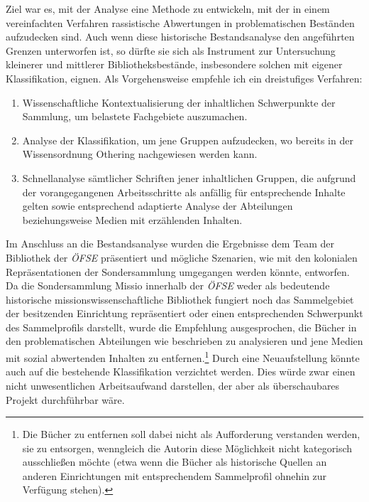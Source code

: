 \documentclass[a4paper,
fontsize=11pt,
oneside,
numbers=noperiodatend,
parskip=half-,
bibliography=totoc,
final
]{scrartcl}
\begin{document}
Ziel war es, mit der Analyse eine Methode zu entwickeln, mit der in
einem vereinfachten Verfahren rassistische Abwertungen in
problematischen Beständen aufzudecken sind. Auch wenn diese historische
Bestandsanalyse den angeführten Grenzen unterworfen ist, so dürfte sie
sich als Instrument zur Untersuchung kleinerer und mittlerer
Bibliotheksbestände, insbesondere solchen mit eigener Klassifikation,
eignen. Als Vorgehensweise empfehle ich ein dreistufiges Verfahren:

\begin{enumerate}
\def\labelenumi{\arabic{enumi}.}
\item
  Wissenschaftliche Kontextualisierung der inhaltlichen Schwerpunkte der
  Sammlung, um belastete Fachgebiete auszumachen.
\item
  Analyse der Klassifikation, um jene Gruppen aufzudecken, wo bereits in
  der Wissensordnung Othering nachgewiesen werden kann.
\item
  Schnellanalyse sämtlicher Schriften jener inhaltlichen Gruppen, die
  aufgrund der vorangegangenen Arbeitsschritte als anfällig für
  entsprechende Inhalte gelten sowie entsprechend adaptierte Analyse der
  Abteilungen beziehungsweise Medien mit erzählenden Inhalten.
\end{enumerate}

Im Anschluss an die Bestandsanalyse wurden die Ergebnisse dem Team der
Bibliothek der \emph{ÖFSE} präsentiert und mögliche Szenarien, wie mit
den kolonialen Repräsentationen der Sondersammlung umgegangen werden
könnte, entworfen. Da die Sondersammlung Missio innerhalb der
\emph{ÖFSE} weder als bedeutende historische missionswissenschaftliche
Bibliothek fungiert noch das Sammelgebiet der besitzenden Einrichtung
repräsentiert oder einen entsprechenden Schwerpunkt des Sammelprofils
darstellt, wurde die Empfehlung ausgesprochen, die Bücher in den
problematischen Abteilungen wie beschrieben zu analysieren und jene
Medien mit sozial abwertenden Inhalten zu entfernen.\footnote{Die Bücher
  zu entfernen soll dabei nicht als Aufforderung verstanden werden, sie
  zu entsorgen, wenngleich die Autorin diese Möglichkeit nicht
  kategorisch ausschließen möchte (etwa wenn die Bücher als historische
  Quellen an anderen Einrichtungen mit entsprechendem Sammelprofil
  ohnehin zur Verfügung stehen).} Durch eine Neuaufstellung könnte auch
auf die bestehende Klassifikation verzichtet werden. Dies würde zwar
einen nicht unwesentlichen Arbeitsaufwand darstellen, der aber als
überschaubares Projekt durchführbar wäre.
\end{document}
